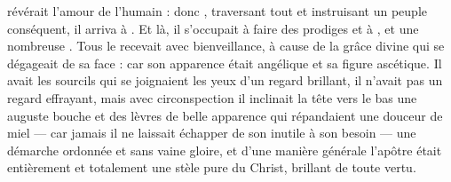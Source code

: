  révérait l'amour de l'humain : %
 donc ,
traversant tout et instruisant un peuple conséquent, il arriva à . %
Et là, il s'occupait à faire des prodiges et à , et une  nombreuse .
 
Tous le recevait avec bienveillance, à cause de la grâce divine qui se dégageait  de sa face :
car son apparence était angélique et sa figure ascétique.
Il avait les sourcils qui se joignaient %
les yeux d'un regard brillant,
il n'avait pas un regard effrayant, mais avec circonspection il inclinait la tête vers le bas %
une auguste bouche et des lèvres de belle apparence qui répandaient une douceur de miel --- 
car jamais il ne laissait  échapper de son inutile à son besoin --- 
une démarche ordonnée et sans vaine gloire, 
et d'une manière générale l'apôtre   était entièrement et totalement une stèle pure du Christ, brillant de toute vertu. %

